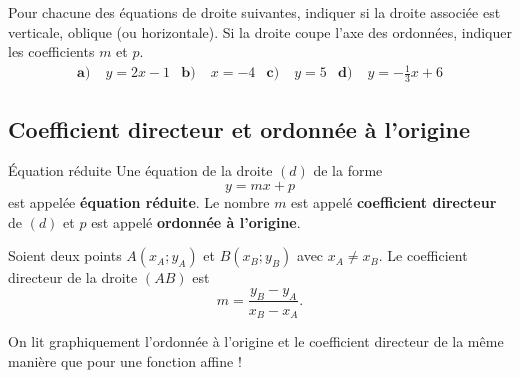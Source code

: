 \documentclass[11pt]{article}
\begin{document}
\begin{app}
  Pour chacune des équations de droite suivantes, indiquer si la droite associée
  est verticale, oblique (ou horizontale). Si la droite coupe l'axe des
  ordonnées, indiquer les coefficients $m$ et $p$.
  \begin{align*}
    \textbf{a)}\;& y = 2x-1 &
    \textbf{b)}\;& x = -4 &
    \textbf{c)}\;& y = 5 &
    \textbf{d)}\;& y = -\frac{1}{3}x+6
  \end{align*}
\end{app}

\subsection{Coefficient directeur et ordonnée à l'origine}
\begin{defi}{Équation réduite}
  Une équation de la droite $(d)$ de la forme 
  \[
    y=mx+p
  \]
  est appelée
  \textbf{équation réduite}. Le nombre $m$ est appelé \textbf{coefficient
  directeur} de $(d)$ et $p$ est appelé \textbf{ordonnée à l'origine}.
\end{defi}

\begin{prop}
  \begin{minipage}[]{.5\textwidth}
    Soient deux points $A\left( x_A; y_A \right)$ et $B\left( x_B; y_B \right)$
    avec $x_A\neq x_B$. Le coefficient directeur de la droite $\left( AB
    \right)$ est
    \[
      m = \frac{y_B-y_A}{x_B-x_A}.
    \]
  \end{minipage}
  \begin{minipage}[]{.5\textwidth}
    \begin{center}
    \end{center}
  \end{minipage}
\end{prop}
\begin{rmq}
  On lit graphiquement l'ordonnée à l'origine et le coefficient directeur de la
  même manière que pour une fonction affine !
\end{rmq}
\end{document}
